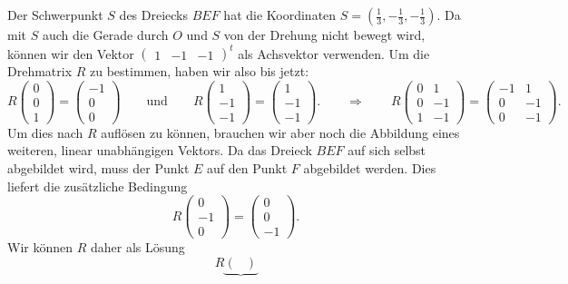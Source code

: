 \begin{loesung}
\begin{teilaufgaben}
\item
Der Schwerpunkt $S$ des Dreiecks $BEF$ hat die Koordinaten
$S=(\frac13,-\frac13,-\frac13)$.
Da mit $S$ auch die Gerade durch $O$ und $S$ von der Drehung nicht bewegt
wird, können wir den Vektor $\begin{pmatrix}1&-1&-1\end{pmatrix}^t$ als
Achsvektor verwenden.
Um die Drehmatrix $R$ zu bestimmen, haben wir also bis jetzt:
\[
R
\begin{pmatrix}0\\0\\1\end{pmatrix}
=
\begin{pmatrix}-1\\0\\0\end{pmatrix}
\qquad\text{und}\qquad
R
\begin{pmatrix}1\\-1\\-1\end{pmatrix}
=
\begin{pmatrix}1\\-1\\-1\end{pmatrix}.
\qquad\Rightarrow\qquad
R
\begin{pmatrix}
0& 1\\
0&-1\\
1&-1
\end{pmatrix}
=
\begin{pmatrix}
-1& 1\\
 0&-1\\
 0&-1
\end{pmatrix}.
\]
Um dies nach $R$ auflösen zu können, brauchen wir aber noch die Abbildung
eines weiteren, linear unabhängigen Vektors.
Da das Dreieck $BEF$ auf sich selbst abgebildet wird, muss der Punkt
$E$ auf den Punkt $F$ abgebildet werden.
Dies liefert die zusätzliche Bedingung
\[
R
\begin{pmatrix}0\\-1\\0\end{pmatrix}
=
\begin{pmatrix}0\\0\\-1\end{pmatrix}.
\]
Wir können $R$ daher als Lösung
\[
R
\underbrace{
\begin{pmatrix}

\end{pmatrix}}\]
\end{teilaufgaben}
\end{loesung}
